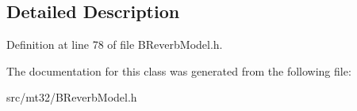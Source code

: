 \subsection{Detailed Description}


Definition at line 78 of file B\-Reverb\-Model.\-h.



The documentation for this class was generated from the following file\-:\begin{DoxyCompactItemize}
\item 
src/mt32/B\-Reverb\-Model.\-h\end{DoxyCompactItemize}
